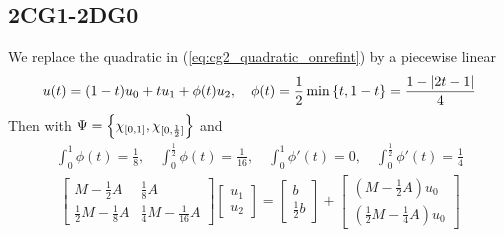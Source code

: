 \documentclass[english,12pt,a4paper]{article}
\begin{document}
\subsection{2CG1-2DG0}\label{subsec:}
%
We replace the quadratic in (\ref{eq:cg2_quadratic_onrefint}) by a piecewise linear
%
\begin{equation}\label{eq:cg2_quadratic_onrefint}
u(t) = (1-t)u_0 + t u_1 + \phi(t) u_2,\quad \phi(t) = \frac12\min\left\{t, 1-t\right\} = \frac{1-|2t-1|}{4} 
\end{equation}
%
Then with $\Psi=\left\{\chi_{[0,1]}, \chi_{[0,\frac12]}\right\}$ and
%
\begin{align*}
\int_0^1 \phi(t) = \frac18,\quad \int_0^{\frac12} \phi(t) = \frac{1}{16},\quad \int_0^1 \phi'(t) = 0,\quad \int_0^{\frac12} \phi'(t) = \frac14
\end{align*}
%
%
\begin{align*}
\begin{bmatrix}
M - \frac12 A & \frac18 A\\
\frac12 M - \frac18 A &  \frac14 M - \frac{1}{16}A
\end{bmatrix}
\begin{bmatrix}
u_1 \\ u_2
\end{bmatrix}
=
\begin{bmatrix}
b \\\frac12 b
\end{bmatrix}
+
\begin{bmatrix}
(M - \frac12 A) u_0  \\ (\frac12 M - \frac14 A) u_0 
\end{bmatrix}
\end{align*}
%
%
\end{document}
